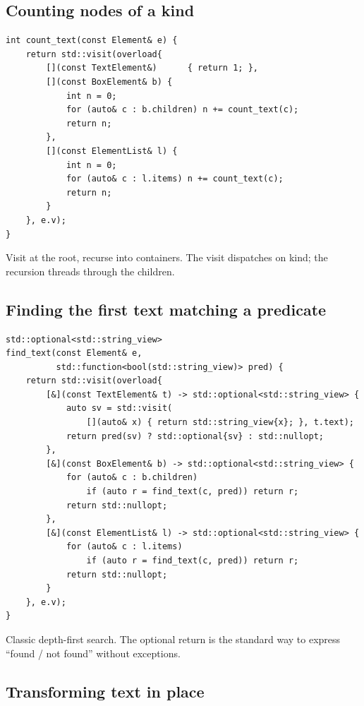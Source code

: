 \subsection*{Counting nodes of a kind}

\begin{lstlisting}
int count_text(const Element& e) {
    return std::visit(overload{
        [](const TextElement&)      { return 1; },
        [](const BoxElement& b) {
            int n = 0;
            for (auto& c : b.children) n += count_text(c);
            return n;
        },
        [](const ElementList& l) {
            int n = 0;
            for (auto& c : l.items) n += count_text(c);
            return n;
        }
    }, e.v);
}
\end{lstlisting}

Visit at the root, recurse into containers. The visit dispatches
on kind; the recursion threads through the children.

\subsection*{Finding the first text matching a predicate}

\begin{lstlisting}
std::optional<std::string_view>
find_text(const Element& e,
          std::function<bool(std::string_view)> pred) {
    return std::visit(overload{
        [&](const TextElement& t) -> std::optional<std::string_view> {
            auto sv = std::visit(
                [](auto& x) { return std::string_view{x}; }, t.text);
            return pred(sv) ? std::optional{sv} : std::nullopt;
        },
        [&](const BoxElement& b) -> std::optional<std::string_view> {
            for (auto& c : b.children)
                if (auto r = find_text(c, pred)) return r;
            return std::nullopt;
        },
        [&](const ElementList& l) -> std::optional<std::string_view> {
            for (auto& c : l.items)
                if (auto r = find_text(c, pred)) return r;
            return std::nullopt;
        }
    }, e.v);
}
\end{lstlisting}

Classic depth-first search. The optional return is the standard
way to express ``found / not found'' without exceptions.

\subsection*{Transforming text in place}


